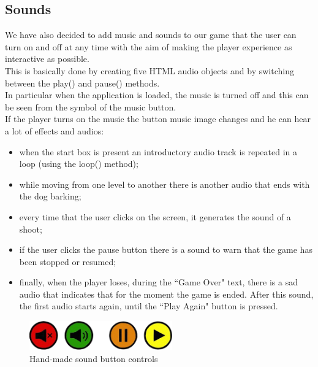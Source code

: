 \documentclass[12pt,a4paper]{article}
\begin{document}
	\subsection{Sounds}
	We have also decided to add music and sounds to our game that the user can turn on and off at any time with the aim of making the player experience as interactive as possible.\\
	This is basically done by creating five HTML audio objects and by switching between the play() and pause() methods.\\
	In particular when the application is loaded, the music is turned off and this can be seen from the symbol of the music button.\\
	If the player turns on the music the button music image changes and he can hear a lot of effects and audios:
	\begin{itemize}
		\item when the start box is present an introductory audio track is repeated in a loop (using the loop() method);
		\item while moving from one level to another there is another audio that ends with the dog barking;
		\item every time that the user clicks on the screen, it generates the sound of a shoot;
		\item if the user clicks the pause button there is a sound to warn that the game has been stopped or resumed;
		\item finally, when the player loses, during the ``Game Over" text, there is a sad audio that indicates that for the moment the game is ended. After this sound, the first audio starts again, until the ``Play Again" button is pressed.
	\end{itemize}
	\begin{figure}[hbt!]
		\centering
		\includegraphics[width=0.55\textwidth]{pulsanti}
		\caption{Hand-made sound button controls}
		\label{fig7}
	\end{figure}
	
\end{document}
